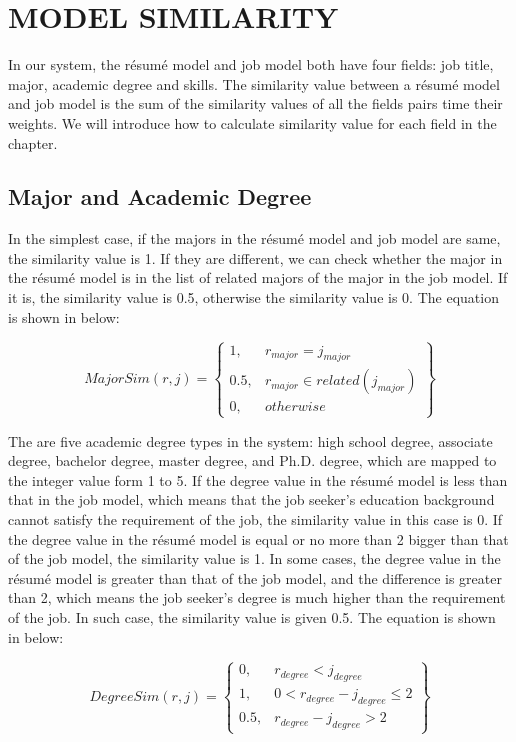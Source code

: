 \chapter{MODEL SIMILARITY}

In our system, the r\'esum\'e model and job model both have four fields: job title, major, academic degree and skills. The similarity value between a r\'esum\'e model and job model is the sum of the similarity values of all the fields pairs time their weights. We will introduce how to calculate similarity value for each field in the chapter.

\section{Major and Academic Degree}

In the simplest case, if the majors in the r\'esum\'e model and job model are same, the similarity value is 1. If they are different, we can check whether the major in the r\'esum\'e model is in the list of related majors of the major in the job model. If it is, the similarity value is 0.5, otherwise the similarity value is 0. The equation is shown in below:

$$ MajorSim(r,j ) = \begin{Bmatrix}
1, & r_{major} = j_{major} \\
0.5, & r_{major} \in related( j_{major} ) \\
0, & otherwise
\end{Bmatrix} $$

The are five academic degree types in the system:  high school degree, associate degree, bachelor degree, master degree, and Ph.D. degree, which are mapped to the integer value form 1 to 5. If the degree value in the r\'esum\'e model is less than that in the job model, which means that the job seeker's education background cannot satisfy the requirement of the job, the similarity value in this case is 0. If the degree value in the r\'esum\'e model is equal or no more than 2 bigger than that of the job model, the similarity value is 1. In some cases, the degree value in the r\'esum\'e model is greater than that of the job model, and the difference is greater than 2, which means the job seeker's degree is much higher than the requirement of the job. In such case, the similarity value is given 0.5. The equation is shown in below:

$$ DegreeSim(r,j ) = \begin{Bmatrix}
0,   & r_{degree} < j_{degree} \\
1,   & 0 < r_{degree} - j_{degree} \leqslant 2  \\
0.5, & r_{degree} - j_{degree} > 2
\end{Bmatrix} $$

